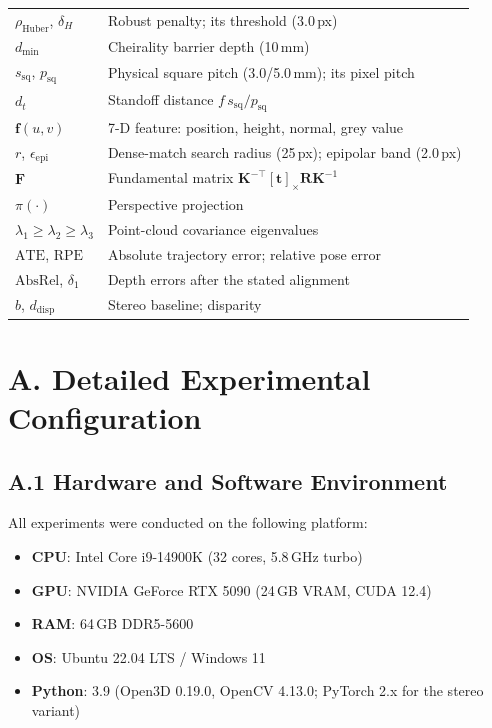 \documentclass[review]{elsarticle}
\begin{document}
\begin{table}[h]
\begin{tabular}{ll}
$\rho_{\mathrm{Huber}}$, $\delta_H$ & Robust penalty; its threshold (3.0\,px) \\
$d_{\min}$ & Cheirality barrier depth (10\,mm) \\
$s_{\mathrm{sq}}$, $p_{\mathrm{sq}}$ & Physical square pitch (3.0/5.0\,mm); its pixel pitch \\
$d_t$ & Standoff distance $f\,s_{\mathrm{sq}}/p_{\mathrm{sq}}$ \\
$\mathbf{f}(u,v)$ & 7-D feature: position, height, normal, grey value \\
$r$, $\epsilon_{\mathrm{epi}}$ & Dense-match search radius (25\,px); epipolar band (2.0\,px) \\
$\mathbf{F}$ & Fundamental matrix $\mathbf{K}^{-\top}[\mathbf{t}]_\times\mathbf{R}\mathbf{K}^{-1}$ \\
$\pi(\cdot)$ & Perspective projection \\
$\lambda_1{\geq}\lambda_2{\geq}\lambda_3$ & Point-cloud covariance eigenvalues \\
$\mathrm{ATE}$, $\mathrm{RPE}$ & Absolute trajectory error; relative pose error \\
$\mathrm{AbsRel}$, $\delta_1$ & Depth errors after the stated alignment \\
$b$, $d_{\mathrm{disp}}$ & Stereo baseline; disparity \\
\bottomrule
\end{tabular}
\end{table}

\section*{A. Detailed Experimental Configuration}

\subsection*{A.1 Hardware and Software Environment}

All experiments were conducted on the following platform:
\begin{itemize}[noitemsep]
    \item \textbf{CPU}: Intel Core i9-14900K (32 cores, 5.8\,GHz turbo)
    \item \textbf{GPU}: NVIDIA GeForce RTX 5090 (24\,GB VRAM, CUDA 12.4)
    \item \textbf{RAM}: 64\,GB DDR5-5600
    \item \textbf{OS}: Ubuntu 22.04 LTS / Windows 11
    \item \textbf{Python}: 3.9 (Open3D 0.19.0, OpenCV 4.13.0; PyTorch 2.x for the stereo variant)
\end{itemize}
\end{document}
